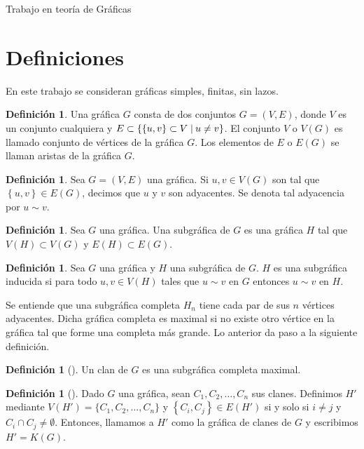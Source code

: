 \documentclass[12pt]{book}
\theoremstyle{definition}
\newtheorem{definition}[theorem]{Definición}
\newcommand{\set}[2]{\{#1\nonscript\;\vert\allowbreak\nonscript\:\mathopen{}#2\}}
\begin{document}
\begin{titlepage}

	\vfill

	{\LARGE Trabajo en teoría de Gráficas}\\[2cm]

	\vfill
\end{titlepage}
\section*{Definiciones}
En este trabajo se consideran gráficas simples, finitas, sin lazos.
\begin{definition}
Una gráfica $G$ consta de dos conjuntos $G=(V,E)$, donde $V$ es un conjunto cualquiera y $E\subset \set{\left\{u,v\right\}\subset V}{u\neq v}$. El conjunto $V$ o $V(G)$ es llamado conjunto de vértices de la gráfica $G$. Los elementos de $E$ o $E(G)$ se llaman aristas de la gráfica $G$.
\end{definition}

\begin{definition}
Sea $G=(V,E)$ una gráfica. Si $u,v\in V(G)$ son tal que $\left\{u,v\right\}\in E(G)$, decimos que $u$ y $v$ son adyacentes. Se denota tal adyacencia por $u\sim v$.
\end{definition}

\begin{definition}
Sea $G$ una gráfica. Una subgráfica de $G$ es una gráfica $H$ tal que $V(H)\subset V(G)$ y $E(H)\subset E(G)$.
\end{definition}

\begin{definition}
Sea $G$ una gráfica y $H$ una subgráfica de $G$. $H$ es una subgráfica inducida si para todo $u,v\in V(H)$ tales que $u\sim v$ en $G$ entonces $u\sim v$ en $H$.
\end{definition}

Se entiende que una subgráfica completa $H_n$ tiene cada par de sus $n$ vértices adyacentes. Dicha gráfica completa es maximal si no existe otro vértice en la gráfica tal que forme una completa más grande. Lo anterior da paso a la siguiente definición.

\begin{definition}[\citealt{Harary:1969}]
Un clan de $G$ es una subgráfica completa maximal. 
\end{definition}

\begin{definition}[\citealt{Roberts:1971}]
Dado $G$ una gráfica, sean $C_1, C_2, \dots, C_n $ sus clanes. Definimos $H'$ mediante $ V(H') = \{C_1, C_2, \dots, C_n\}$ y $\left\{C_i, C_j\right\}\in E(H')$ si y solo si $i \neq j$ y $C_i \cap C_j \neq \emptyset$.  
Entonces, llamamos a $H'$ como la gráfica de clanes de $G$ y escribimos $H'=K(G)$.
\end{definition}
\end{document}
